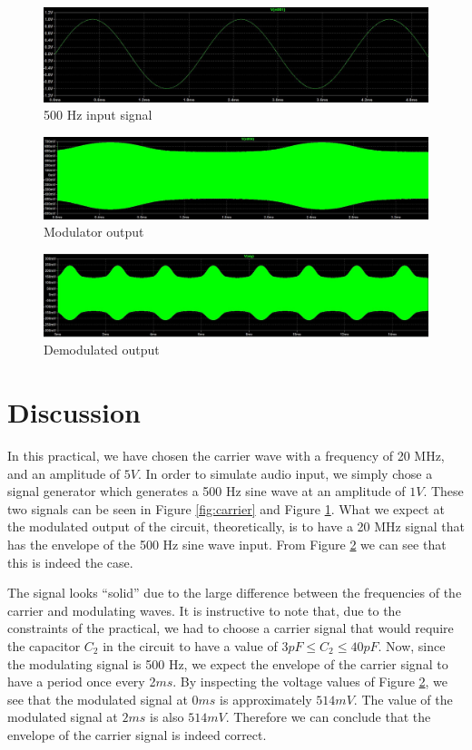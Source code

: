 \documentclass[12pt, a4paper]{article}
\begin{document}
	\begin{figure}[H]
		\centering
		\includegraphics[width=.8\textwidth]{images/modulating.JPG}
		\caption{500 Hz input signal}
		\label{fig:modulating}
	\end{figure}

	\begin{figure}[H]
		\centering
		\includegraphics[width=.8\textwidth]{images/output_modulated.JPG}
		\caption{Modulator output}
		\label{fig:output_modulated}
	\end{figure}

	\begin{figure}[H]
		\centering
		\includegraphics[width=.8\textwidth]{images/output_demodulated.JPG}
		\caption{Demodulated output}
		\label{fig:output_demodulated}
	\end{figure}

\section{Discussion} %
\label{sec:discussion}
	In this practical, we have chosen the carrier wave with a frequency of 20 MHz, and an amplitude of $5V$. In order to simulate audio input, we simply chose a signal generator which generates a 500 Hz sine wave at an amplitude of $1V$. These two signals can be seen in Figure \ref{fig:carrier} and Figure \ref{fig:modulating}. What we expect at the modulated output of the circuit, theoretically, is to have a 20 MHz signal that has the envelope of the 500 Hz sine wave input. From Figure \ref{fig:output_modulated} we can see that this is indeed the case.

	The signal looks ``solid'' due to the large difference between the frequencies of the carrier and modulating waves. It is instructive to note that, due to the constraints of the practical, we had to choose a carrier signal that would require the capacitor $C_2$ in the circuit to have a value of $3pF \le C_2 \le 40pF$. Now, since the modulating signal is 500 Hz, we expect the envelope of the carrier signal to have a period once every 2$ms$. By inspecting the voltage values of Figure \ref{fig:output_modulated}, we see that the modulated signal at 0$ms$ is approximately $514mV$. The value of the modulated signal at $2ms$ is also $514mV$. Therefore we can conclude that the envelope of the carrier signal is indeed correct.
\end{document}
